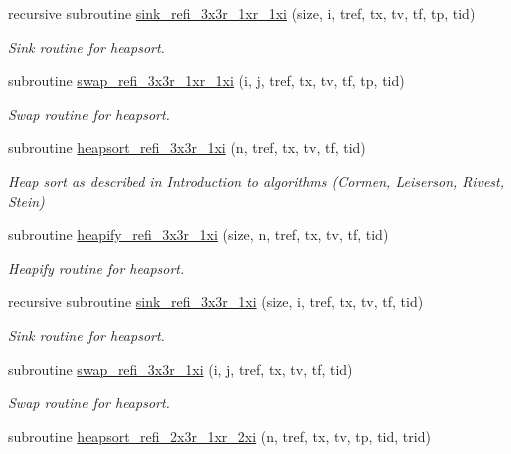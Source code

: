 \begin{DoxyCompactItemize}
recursive subroutine \hyperlink{classmodsortinterf_ae5d0d975d09f35e272f74fd81d7b47ad}{sink\-\_\-refi\-\_\-3x3r\-\_\-1xr\-\_\-1xi} (size, i, tref, tx, tv, tf, tp, tid)
\begin{DoxyCompactList}\small\item\em Sink routine for heapsort. \end{DoxyCompactList}\item 
subroutine \hyperlink{classmodsortinterf_a60ffd9cc7a965d3c76235d07eee8e5a1}{swap\-\_\-refi\-\_\-3x3r\-\_\-1xr\-\_\-1xi} (i, j, tref, tx, tv, tf, tp, tid)
\begin{DoxyCompactList}\small\item\em Swap routine for heapsort. \end{DoxyCompactList}\item 
subroutine \hyperlink{classmodsortinterf_a202fac9db69240603932abfc99728f45}{heapsort\-\_\-refi\-\_\-3x3r\-\_\-1xi} (n, tref, tx, tv, tf, tid)
\begin{DoxyCompactList}\small\item\em Heap sort as described in Introduction to algorithms (Cormen, Leiserson, Rivest, Stein) \end{DoxyCompactList}\item 
subroutine \hyperlink{classmodsortinterf_a9f5b12ccf35aeeb51dbc5e91f8bf5e69}{heapify\-\_\-refi\-\_\-3x3r\-\_\-1xi} (size, n, tref, tx, tv, tf, tid)
\begin{DoxyCompactList}\small\item\em Heapify routine for heapsort. \end{DoxyCompactList}\item 
recursive subroutine \hyperlink{classmodsortinterf_a1860e4f1d67c4f289bb9039a468d27d3}{sink\-\_\-refi\-\_\-3x3r\-\_\-1xi} (size, i, tref, tx, tv, tf, tid)
\begin{DoxyCompactList}\small\item\em Sink routine for heapsort. \end{DoxyCompactList}\item 
subroutine \hyperlink{classmodsortinterf_ae808efa092d91c79ce51e8c3c52c5b56}{swap\-\_\-refi\-\_\-3x3r\-\_\-1xi} (i, j, tref, tx, tv, tf, tid)
\begin{DoxyCompactList}\small\item\em Swap routine for heapsort. \end{DoxyCompactList}\item 
subroutine \hyperlink{classmodsortinterf_a662bed8ed392d0d204cc36d1e48fce5b}{heapsort\-\_\-refi\-\_\-2x3r\-\_\-1xr\-\_\-2xi} (n, tref, tx, tv, tp, tid, trid)

\end{DoxyCompactItemize}
